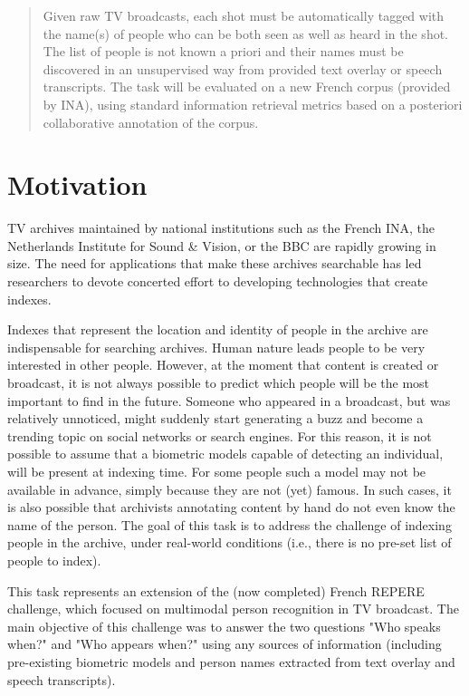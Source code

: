 \documentclass{acm_proc_article-me}
\begin{document}
\maketitle
\begin{abstract}
Given raw TV broadcasts, each shot must be automatically tagged with the name(s) of people who can be both seen as well as heard in the shot. The list of people is not known a priori and their names must be discovered in an unsupervised way from provided text overlay or speech transcripts. The task will be evaluated on a new French corpus (provided by INA), using standard information retrieval metrics based on a posteriori collaborative annotation of the corpus.
\end{abstract}

\section{Motivation}

TV archives maintained by national institutions such as the French INA, the Netherlands Institute for Sound \& Vision, or the BBC are rapidly growing in size. The need for applications that make these archives searchable has led researchers to devote concerted effort to developing technologies that create indexes.

Indexes that represent the location and identity of people in the archive are indispensable for searching archives. Human nature leads people to be very interested in other people. However, at the moment that content is created or broadcast, it is not always possible to predict which people will be the most important to find in the future. Someone who appeared in a broadcast, but was relatively unnoticed, might suddenly start generating a buzz and become a trending topic on social networks or search engines. For this reason, it is not possible to assume that a biometric models capable of detecting an individual, will be present at indexing time. For some people such a model may not be available in advance, simply because they are not (yet) famous. In such cases, it is also possible that archivists annotating content by hand do not even know the name of the person. The goal of this task is to address the challenge of indexing people in the archive, under real-world conditions (i.e., there is no pre-set list of people to index). 

This task represents an extension of the (now completed) French REPERE challenge, which focused on multimodal person recognition in TV broadcast. The main objective of this challenge was to answer the two questions "Who speaks when?" and "Who appears when?" using any sources of information (including pre-existing biometric models and person names extracted from text overlay and speech transcripts). 
\end{document}
